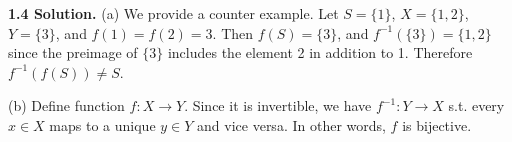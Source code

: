 \textbf{1.4 Solution.} (a)  We provide a counter example. Let $S=\{1\}$, $X=\{1, 2\}$, $Y=\{3\}$, and $f(1)=f(2)=3$. Then $f(S)=\{3\}$, and $f^{-1}(\{3\})=\{1, 2\}$ since the preimage of $\{3\}$ includes the element 2 in addition to 1. Therefore $f^{-1}(f(S))\neq S$.

(b) Define function $f:X\to Y$. Since it is invertible, we have $f^{-1}:Y\to X$ s.t. every $x\in X$ maps to a unique $y\in Y$ and vice versa. In other words, $f$ is bijective. 